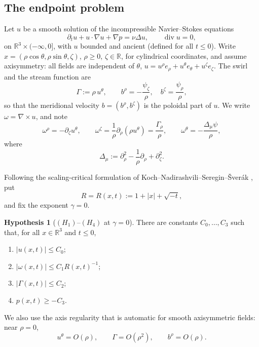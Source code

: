 \documentclass[11pt]{article}
\theoremstyle{definition}
\newtheorem{hypothesis}[theorem]{Hypothesis}
\newcommand{\R}{\mathbb{R}}
\newcommand{\Div}{\operatorname{div}}
\begin{document}
\subsection{The endpoint problem}
Let $u$ be a smooth solution of the incompressible Navier--Stokes equations
\begin{equation}\label{eq:NS}
\partial_t u+u\cdot\nabla u+\nabla p=\nu\Delta u,\qquad \Div u=0,
\end{equation}
on $\R^3\times(-\infty,0]$, with $u$ bounded and ancient (defined for all
$t\le0$). Write $x=(\rho\cos\theta,\rho\sin\theta,\zeta)$, $\rho\ge0$,
$\zeta\in\R$, for cylindrical coordinates, and assume axisymmetry: all fields
are independent of $\theta$, $u=u^\rho e_\rho+u^\theta e_\theta+u^\zeta e_\zeta$.
The swirl and the stream function are
\begin{equation}
\Gamma:=\rho\,u^\theta,\qquad
b^\rho=-\frac{\psi_\zeta}{\rho},\quad b^\zeta=\frac{\psi_\rho}{\rho},
\end{equation}
so that the meridional velocity $b=(b^\rho,b^\zeta)$ is the poloidal part of
$u$. We write $\omega=\nabla\times u$, and note
\begin{equation}\label{eq:identities}
\omega^\rho=-\partial_\zeta u^\theta,\qquad
\omega^\zeta=\frac{1}{\rho}\partial_\rho(\rho u^\theta)=\frac{\Gamma_\rho}{\rho},
\qquad \omega^\theta=-\frac{\Delta_\mu\psi}{\rho},
\end{equation}
where
\begin{equation}\label{eq:Dmu}
\Delta_\mu:=\partial_\rho^2-\frac1\rho\partial_\rho+\partial_\zeta^2 .
\end{equation}

Following the scaling-critical formulation of
Koch--Nadirashvili--Seregin--\v{S}ver\'ak \cite{KNSS}, put
\begin{equation}\label{eq:R}
R=R(x,t):=1+|x|+\sqrt{-t},
\end{equation}
and fix the exponent $\gamma=0$.

\begin{hypothesis}[$(H_1)$--$(H_4)$ at $\gamma=0$]\label{hyp:main}
There are constants $C_0,\dots,C_3$ such that, for all $x\in\R^3$ and
$t\le0$,
\begin{enumerate}
\item[(H1)] $|u(x,t)|\le C_0$;
\item[(H2)] $|\omega(x,t)|\le C_1R(x,t)^{-1}$;
\item[(H3)] $|\Gamma(x,t)|\le C_2$;
\item[(H4)] $p(x,t)\ge-C_3$.
\end{enumerate}
\end{hypothesis}
We also use the axis regularity that is automatic for smooth axisymmetric
fields: near $\rho=0$,
\begin{equation}\label{eq:axis}
u^\theta=O(\rho),\qquad \Gamma=O(\rho^2),\qquad b^\rho=O(\rho).
\end{equation}
\end{document}
